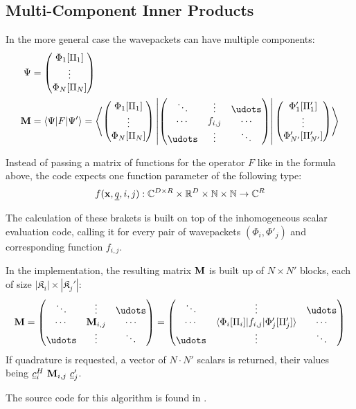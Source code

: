 \subsection{Multi-Component Inner Products}

In the more general case the wavepackets can have multiple components:
\begin{align}
  \Psi &= \begin{pmatrix} \Phi_1[\Pi_1] \\ \vdots \\ \Phi_N[\Pi_N] \end{pmatrix} \\
  \mat{M} &= \langle \Psi | F | \Psi' \rangle = \left\langle
    \begin{pmatrix} \Phi_1[\Pi_1] \\ \vdots \\ \Phi_N[\Pi_N] \end{pmatrix} \left|
    \begin{pmatrix} \ddots & \vdots & \udots \\ \cdots & f_{i,j} & \cdots \\
      \udots & \vdots & \ddots \end{pmatrix} \right|
    \begin{pmatrix} \Phi'_1[\Pi_1'] \\ \vdots \\ \Phi'_{N'}[\Pi_{N'}'] \end{pmatrix}
    \right\rangle
\end{align}

Instead of passing a matrix of functions for the operator $F$ like in the
formula above, the code expects one function parameter of the following type:
\begin{equation}
  f(\mathbf{x}, \underline{q}, i, j) : \mathbb{C}^{D \times R} \times \mathbb{R}^D
  \times \mathbb{N} \times \mathbb{N} \rightarrow \mathbb{C}^R
\end{equation}

The calculation of these brakets is built on top of the inhomogeneous scalar
evaluation code, calling it for every pair of wavepackets $(\Phi_i,\Phi'_j)$ and
corresponding function $f_{i,j}$.

In the implementation, the resulting matrix $\mathbf{M}$ is built up of $N \times
N'$ blocks, each of size $|\mathfrak{K}_i| \times |\mathfrak{K}_j'|$:
\begin{equation}
  \mat{M} = \begin{pmatrix} \ddots & \vdots & \udots \\
    \cdots & \mat{M}_{i,j} & \cdots \\
    \udots & \vdots & \ddots
  \end{pmatrix} =
  \begin{pmatrix} \ddots & \vdots & \udots \\
    \cdots & \langle \Phi_i[\Pi_i]|f_{i,j}|\Phi'_j[\Pi_j'] \rangle & \cdots \\
    \udots & \vdots & \ddots
  \end{pmatrix}
\end{equation}
If quadrature is requested, a vector of $N \cdot N'$ scalars is returned, their
values being $\vect{c}_i^H \ \mat{M}_{i,j} \ \vect{c}'_j$.

The source code for this algorithm is found in
.
